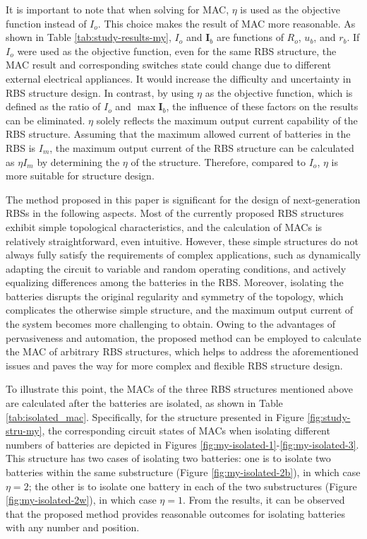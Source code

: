 \documentclass{article}
\begin{document}
It is important to note that when solving for MAC, $\eta$ is used as the objective function instead of $I_o$. 
This choice makes the result of MAC more reasonable. 
As shown in Table \ref{tab:study-results-my}, $I_o$ and $\bm{I}_b$ are functions of $R_o$, $u_b$, and $r_b$. 
If $I_o$ were used as the objective function, even for the same RBS structure, the MAC result and corresponding switches state could change due to different external electrical appliances.
It would increase the difficulty and uncertainty in RBS structure design. 
In contrast, by using $\eta$ as the objective function, which is defined as the ratio of $I_o$ and $\max\bm{I}_b$, the influence of these factors on the results can be eliminated. 
$\eta$ solely reflects the maximum output current capability of the RBS structure. 
Assuming that the maximum allowed current of batteries in the RBS is $I_m$, the maximum output current of the RBS structure can be calculated as $\eta I_m$ by determining the $\eta$ of the structure. 
Therefore, compared to $I_o$, $\eta$ is more suitable for structure design.


The method proposed in this paper is significant for the design of next-generation RBSs in the following aspects.
Most of the currently proposed RBS structures\cite{ciNovelDesignAdaptive2007,alahmadBatterySwitchArray2008,kimDependableEfficientScalable2010b,kimBalancedReconfigurationStorage2011a,taesickimSeriesconnectedSelfreconfigurableMulticell2012a,6843711} exhibit simple topological characteristics, and the calculation of MACs is relatively straightforward, even intuitive.
However, these simple structures do not always fully satisfy the requirements of complex applications, such as dynamically adapting the circuit to variable and random operating conditions, and actively equalizing differences among the batteries in the RBS.
Moreover, isolating the batteries disrupts the original regularity and symmetry of the topology, which complicates the otherwise simple structure, and the maximum output current of the system becomes more challenging to obtain.
Owing to the advantages of pervasiveness and automation, the proposed method can be employed to calculate the MAC of arbitrary RBS structures, which helps to address the aforementioned issues and paves the way for more complex and flexible RBS structure design.


To illustrate this point, the MACs of the three RBS structures mentioned above are calculated after the batteries are isolated, as shown in Table \ref{tab:isolated_mac}. 
Specifically, for the structure presented in Figure \ref{fig:study-stru-my}, the corresponding circuit states of MACs when isolating different numbers of batteries are depicted in Figures \ref{fig:my-isolated-1}-\ref{fig:my-isolated-3}. 
This structure has two cases of isolating two batteries: 
one is to isolate two batteries within the same substructure (Figure \ref{fig:my-isolated-2b}), in which case $\eta=2$; the other is to isolate one battery in each of the two substructures (Figure \ref{fig:my-isolated-2w}), in which case $\eta=1$. 
From the results, it can be observed that the proposed method provides reasonable outcomes for isolating batteries with any number and position.
\end{document}
